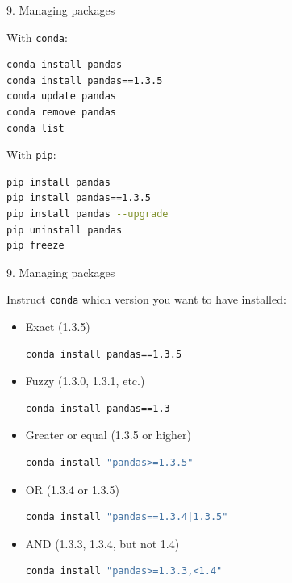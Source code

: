 
\begin{vbframe}{9. Managing packages}

\vfill

With \texttt{conda}:

\begin{lstlisting}[language=bash]
conda install pandas
conda install pandas==1.3.5
conda update pandas
conda remove pandas
conda list
\end{lstlisting}

With \texttt{pip}:

\begin{lstlisting}[language=bash]
pip install pandas
pip install pandas==1.3.5
pip install pandas --upgrade
pip uninstall pandas
pip freeze
\end{lstlisting}

\vfill

\end{vbframe}


\begin{vbframe}{9. Managing packages}

\vfill

Instruct \texttt{conda} which version you want to have installed:

\begin{itemize}
	\item Exact (1.3.5)
\begin{lstlisting}[language=bash]
conda install pandas==1.3.5
\end{lstlisting}
	\item Fuzzy (1.3.0, 1.3.1, etc.)
\begin{lstlisting}[language=bash]
conda install pandas==1.3
\end{lstlisting}
	\item Greater or equal (1.3.5 or higher)
\begin{lstlisting}[language=bash]
conda install "pandas>=1.3.5"
\end{lstlisting}
	\item OR (1.3.4 or 1.3.5)
\begin{lstlisting}[language=bash]
conda install "pandas==1.3.4|1.3.5"
\end{lstlisting}
	\item AND (1.3.3, 1.3.4, but not 1.4)
\begin{lstlisting}[language=bash]
conda install "pandas>=1.3.3,<1.4"
\end{lstlisting}

\end{itemize}

\vfill

\end{vbframe}

